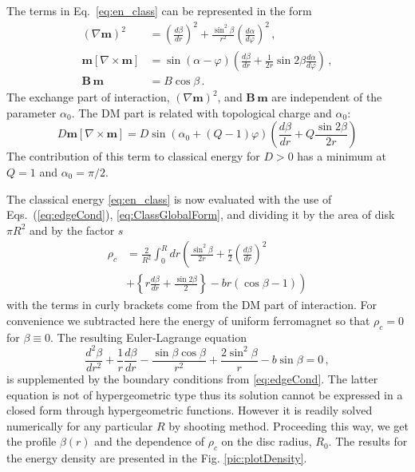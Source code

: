 \documentclass[aps,prb,twocolumn,superscriptaddress,nobalancelastpage]{revtex4-1}
\begin{document}
The terms in Eq.\  \eqref{eq:en_class} can be represented in the form 
\begin{equation}
\begin{aligned}
  \left( \nabla \mathbf{m} \right)^2
  &= \left( \frac{d\beta }{dr} \right)^2 + \frac{\sin^2\beta }{r^2}
  \left( \frac{d\alpha }{d\varphi } \right)^2   \,,  \\
  \mathbf{m}\left[ \nabla  \times \mathbf{m} \right] 
  & = \sin \left( \alpha  - \varphi  \right)\left( \frac{d\beta }{dr} + \frac{1}{2r}\sin 2\beta   \frac{d\alpha }{d\varphi } \right)  \,,  \\
  \mathbf{B}\, \mathbf{m} &= B\cos \beta    \,.
\end{aligned}
\label{eq:ClassGlobalForm}
\end{equation} 
The exchange part of interaction, $  \left( \nabla \mathbf{m} \right)^2$, and  $\mathbf{B}\, \mathbf{m} $ are independent of the parameter $\alpha _0$. The DM part is related with topological charge and $\alpha _0$:
\[D \mathbf{m}\left[ \nabla  \times \mathbf{m} \right] =D \sin \left( \alpha _0 +(Q - 1 )\varphi  \right)\left( \frac{d\beta }{dr} + Q\frac{\sin 2\beta}{2r} \right)\]
The contribution of this term to classical energy for  $D > 0$  has a minimum at $Q=1$ and $ \alpha _0 = \pi/2  $. 
 
 
The classical energy \eqref{eq:en_class} is now evaluated with the use of  Eqs.\  (\ref{eq:edgeCond}),  \eqref{eq:ClassGlobalForm}, and dividing it by the area of disk $\pi R^{2}$ and by the factor $s$
\begin{equation}
\begin{aligned}
  \rho _c &=   \frac{2 }{R^2}\int _{0}^{R} 
  dr\left( \frac{\sin^2\beta }{2r} + \frac{r}{2}  \left( \frac{d\beta }{dr} \right)^2 \right.   \\
&\left. { + \left\{ r\frac{{d\beta }}{{dr}} + \frac{{\sin 2\beta }}{2} \right\} - br\left( {\cos \beta  - 1} \right)} \right)  
\end{aligned}
\label{eq:density}
\end{equation}
with the terms in curly brackets come from the DM part of interaction. For   convenience we subtracted  here the energy of uniform ferromagnet  so that  $\rho_{c} =0$ for $\beta \equiv 0$. 
The resulting Euler-Lagrange equation
\begin{equation}
\frac{d^2\beta }{dr^2} + \frac{1}{r}\frac{d\beta }{dr} - \frac{\sin \beta \cos \beta }{r^2} + \frac{2\sin ^2\beta }{r} - b\sin \beta  = 0 \,,
\label{eq:eulerLagr}
\end{equation}
is supplemented by the boundary conditions from \eqref{eq:edgeCond}.
The latter equation  is not of hypergeometric type thus its solution cannot be expressed in a closed form through hypergeometric functions. However it is readily solved numerically for any particular $R$ by shooting method. Proceeding this way,  we get the profile $\beta(r)$ and the dependence of $\rho_c$  on the  disc radius, $R_{0}$. The results for the energy density are presented in the Fig. \ref{pic:plotDensity}. 
\end{document}
